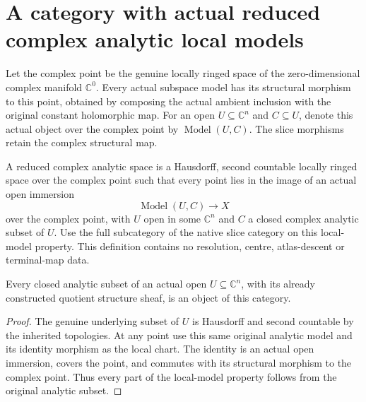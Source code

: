 \section{A category with actual reduced complex analytic local models}

\begin{definition}
\label{hir:reduced-analytic-complex-point-models}
Let the complex point be the genuine locally ringed space of the
zero-dimensional complex manifold $\mathbb C^0$. Every actual subspace
model has its structural morphism to this point, obtained by composing
the actual ambient inclusion with the original constant holomorphic map.
For an open $U\subseteq\mathbb C^n$ and $C\subseteq U$, denote this
actual object over the complex point by $\operatorname{Model}(U,C)$.
The slice morphisms retain the complex structural map.
\leanok
\end{definition}

\begin{definition}
\label{hir:reduced-analytic-space-category}
A reduced complex analytic space is a Hausdorff, second countable
locally ringed space over the complex point such that every point lies
in the image of an actual open immersion
\[
 \operatorname{Model}(U,C)\longrightarrow X
\]
over the complex point, with $U$ open in some $\mathbb C^n$ and $C$ a
closed complex analytic subset of $U$. Use the full subcategory of the
native slice category on this local-model property. This definition
contains no resolution, centre, atlas-descent or terminal-map data.
\leanok
\end{definition}

\begin{theorem}
\label{hir:reduced-analytic-embedded-model-object}
Every closed analytic subset of an actual open $U\subseteq\mathbb C^n$,
with its already constructed quotient structure sheaf, is an object of
this category.
\leanok
\end{theorem}
\begin{proof}
The genuine underlying subset of $U$ is Hausdorff and second countable
by the inherited topologies. At any point use this same original
analytic model and its identity morphism as the local chart. The identity
is an actual open immersion, covers the point, and commutes with its
structural morphism to the complex point. Thus every part of the
local-model property follows from the original analytic subset.
\end{proof}

